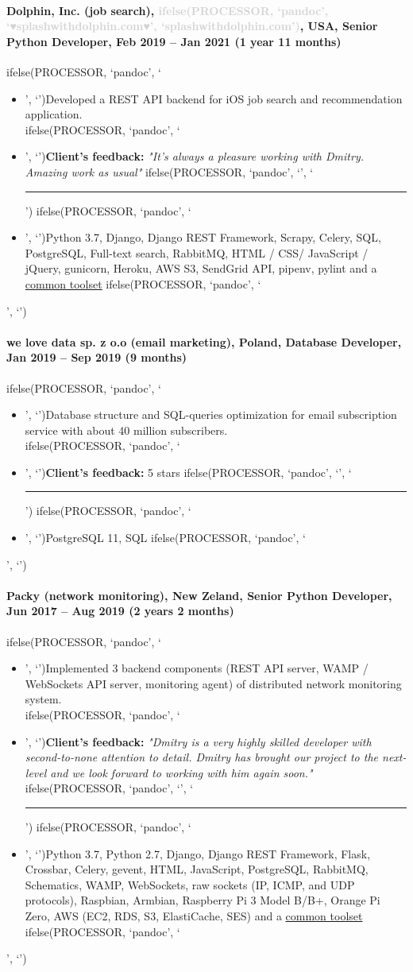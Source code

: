 \documentclass[a4paper,8pt]{extarticle}
\newcommand{\chrule}{ifelse(PROCESSOR, `pandoc', `', `\vspace{3pt}\hrule')}
\newcommand{\brokenhreflg}[1]{\textcolor{lightgray}{ifelse(PROCESSOR, `pandoc', `♥#1♥', `#1')}}
\newcommand{\pdbeginitemize}{ifelse(PROCESSOR, `pandoc', `\begin{itemize}', `')}
\newcommand{\pditem}{ifelse(PROCESSOR, `pandoc', `\item', `')}
\newcommand{\pdenditemize}{ifelse(PROCESSOR, `pandoc', `\end{itemize}', `')}
\begin{document}
\paragraph*{Dolphin, Inc. (job search), \brokenhreflg{splashwithdolphin.com}, USA, Senior Python Developer, Feb 2019 -- Jan 2021 (1 year 11 months)}
\pdbeginitemize
\pditem Developed a REST API backend for iOS job search and recommendation application.\\
\pditem \textbf{Client's feedback:} \textit{"It's always a pleasure working with Dmitry. Amazing work as usual"}
\chrule
\pditem Python 3.7, Django, Django REST Framework, Scrapy, Celery, SQL, PostgreSQL, Full-text search, RabbitMQ, HTML / CSS/ JavaScript / jQuery, gunicorn, Heroku, AWS S3, SendGrid API, pipenv, pylint and a \hyperlink{common-toolset}{common toolset}
\pdenditemize

\paragraph*{we love data sp. z o.o (email marketing), Poland, Database Developer, Jan 2019 -- Sep 2019 (9 months)}
\pdbeginitemize
\pditem Database structure and SQL-queries optimization for email subscription service with about 40 million subscribers.\\
\pditem \textbf{Client's feedback:} 5 stars
\chrule
\pditem PostgreSQL 11, SQL
\pdenditemize

\paragraph*{Packy (network monitoring), New Zeland, \textbf{Senior Python Developer}, Jun 2017 -- Aug 2019 (2 years 2 months)}
\pdbeginitemize
\pditem Implemented 3 backend components (REST API server, WAMP / WebSockets API server, monitoring agent) of distributed network monitoring system.\\
\pditem \textbf{Client's feedback:} \textit{"Dmitry is a very highly skilled developer with second-to-none attention to detail. Dmitry has brought our project to the next-level and we look forward to working with him again soon."}
\chrule
\pditem Python 3.7, Python 2.7, Django, Django REST Framework, Flask, Crossbar, Celery, gevent, HTML, JavaScript, PostgreSQL, RabbitMQ, Schematics, WAMP, WebSockets, raw sockets (IP, ICMP, and UDP protocols), Raspbian, Armbian, Raspberry Pi 3 Model B/B+, Orange Pi Zero, AWS (EC2, RDS, S3, ElastiCache, SES) and a \hyperlink{common-toolset}{common toolset}
\pdenditemize
\end{document}
